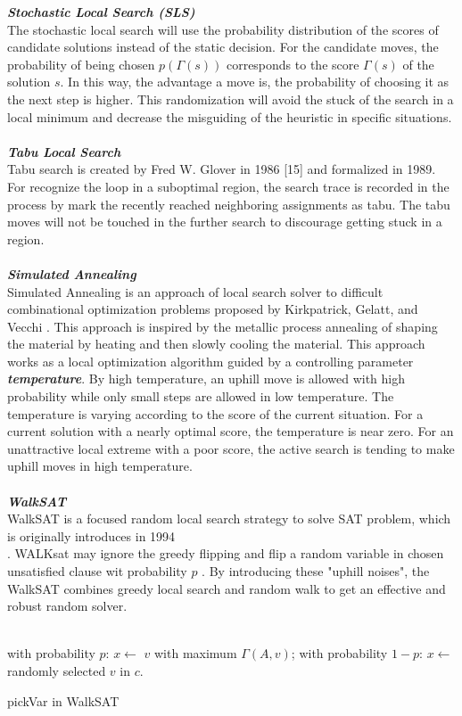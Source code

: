 \documentclass[12pt,a4paper,twoside]{scrartcl}
\numberwithin{equation}{section}
\begin{document}
\emph{\textbf{Stochastic Local Search (SLS)}}\\
The stochastic local search will use the probability distribution of the scores of candidate solutions instead of the static decision. For the candidate moves, the probability of being chosen $p(\Gamma(s))$ corresponds to the score $\Gamma(s)$ of the solution $s$. In this way, the advantage a move is, the probability of choosing it as the next step is higher. This randomization will avoid the stuck of the search in a local minimum and decrease the misguiding of the heuristic in specific situations. \\
\\
\emph{\textbf{Tabu Local Search }}\\
 Tabu search is created by Fred W. Glover in 1986 [15] and formalized in 1989.  For recognize the loop in a suboptimal region, the search trace is recorded in the process by mark the recently reached neighboring assignments as tabu. The tabu moves will not be touched in the further search to discourage getting stuck in a region. \\
\\
\emph{\textbf{Simulated Annealing}}\\
Simulated Annealing is an approach of local search solver to difficult combinational optimization problems proposed by Kirkpatrick, Gelatt, and Vecchi \cite{kirkpatrick1983optimization}. This approach is inspired by the metallic process annealing of shaping the material by heating and then slowly cooling the material. This approach works as a local optimization algorithm guided by a controlling parameter \emph{\textbf{temperature}}. By high temperature, an uphill move is allowed with high probability while only small steps are allowed in low temperature. The temperature is varying according to the score of the current situation.  For a current solution with a nearly optimal score, the temperature is near zero. For an unattractive local extreme with a poor score, the active search is tending to make uphill moves in high temperature.\\
\\
\emph{\textbf{WalkSAT}}\\
WalkSAT is a focused random local search strategy to solve SAT problem, which is originally introduces in 1994 \cite{hoos2002adaptive}\\. WALKsat may ignore the greedy flipping and flip a random variable in chosen unsatisfied clause wit probability $p$ . By introducing these "uphill noises", the WalkSAT combines greedy local search and random walk to get an effective and robust random solver. \\
\\
\begin{algorithm}[H]
  with probability $p$: $x \leftarrow$   $v$ with maximum $\Gamma(A,v)$; \;
  with probability $1-p$:  $x \leftarrow$  randomly selected $v$ in $c$. 
 \caption{pickVar in WalkSAT}
\end{algorithm}  
\end{document}
